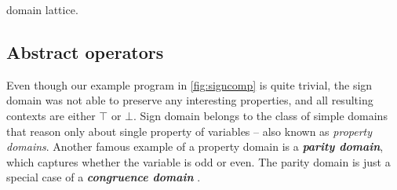 
\begin{marginfigure}%
    \centering
{}
    \caption{ domain lattice.}
    \label{fig:cp}%
\end{marginfigure}%

\subsection{Abstract operators}



\prule
\bigskip

Even though our example program in \autoref{fig:signcomp} is quite trivial, the
sign domain  was not able to preserve any interesting properties,
and all resulting contexts are either $\top$ or $\bot$.  Sign domain belongs to
the class of simple domains that reason only about single property of variables --
also known as \emph{property domains}. Another famous example of a property
domain is a \textbf{\emph{parity domain}}, which captures whether the
variable is odd or even. The parity domain is just a special case of a
\textbf{\emph{congruence domain}} \cite{Granger1989, Granger1991}.

